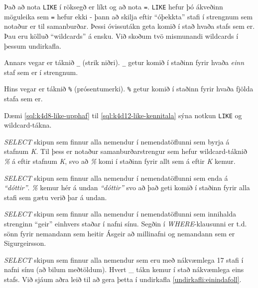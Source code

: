 Það að nota \verb|LIKE| í röksegð er líkt og að nota \verb|=|. \verb|LIKE| hefur þó ákveðinn möguleika sem \verb|=| hefur ekki - þann að skilja eftir ``óþekkta'' stafi í strengnum sem notaður er til samanburðar. Þessi óvissutákn geta komið í stað hvaða stafs sem er. Þau eru kölluð ``wildcards'' á ensku. Við skoðum tvö mismunandi wildcards í þessum undirkafla. 

Annars vegar er táknið \verb|_| (strik niðri). \verb|_| getur komið í staðinn fyrir hvaða \emph{einn} staf sem er í strengnum.

Hins vegar er táknið \verb|%| (prósentumerki). \verb|%| getur komið í staðinn fyrir hvaða fjölda stafa sem er.

Dæmi \ref{sql:k4d8-like-upphaf} til \ref{sql:k4d12-like-kennitala} sýna notkun \verb|LIKE| og wildcard-tákna.

\begin{example}
\caption[LIKE til að finna orð sem byrja á sama staf]{\emph{SELECT} skipun sem finnur alla nemendur í nemendatöflunni sem byrja á stafnum \emph{K}. Til þess er notaður samanburðarstrengur sem hefur wildcard-táknið \emph{\%} á eftir stafnum \emph{K}, svo að \emph{\%} komi í staðinn fyrir allt sem á eftir \emph{K} kemur.}
\label{sql:k4d8-like-upphaf}
\centering
{}
\end{example}

\begin{example}
\caption[LIKE til að finna orð sem enda eins]{\emph{SELECT} skipun sem finnur alla nemendur í nemendatöflunni sem enda á \emph{``dóttir''}. \emph{\%} kemur hér á undan \emph{``dóttir''} svo að það geti komið í staðinn fyrir alla stafi sem gætu verið þar á undan.}
\label{sql:k4d9-like-lok}
\centering
{}
\end{example}

\begin{example}
\caption[LIKE einhvers staðar í streng]{\emph{SELECT} skipun sem finnur alla nemendur í nemendatöflunni sem innihalda strenginn ``geir'' einhvers staðar í nafni sínu. Segðin í \emph{WHERE}-klausunni er t.d. sönn fyrir nemandann sem heitir Ásgeir að millinafni og nemandann sem er Sigurgeirsson.}
\label{sql:k4d10-like-midja}
\centering
{}
\end{example}

\begin{example}
\caption[LIKE til að finna strengi af ákveðinni lengd]{\emph{SELECT} skipun sem finnur alla nemendur sem eru með nákvæmlega 17 stafi í nafni sínu (að bilum meðtöldum). Hvert \_ tákn kemur í stað nákvæmlega eins stafs. Við sjáum aðra leið til að gera þetta í undirkafla \ref{undirkafli:einindafoll}.}
\label{sql:k4d11-like-nakvaemt}
\centering
{}
\end{example}

